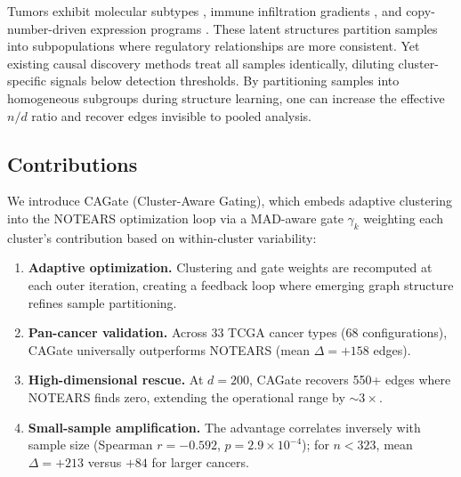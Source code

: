 \documentclass[12pt,a4paper]{article}
\begin{document}
Tumors exhibit molecular subtypes \cite{Perou2000}, immune infiltration gradients \cite{Thorsson2018}, and copy-number-driven expression programs \cite{Zack2013}. These latent structures partition samples into subpopulations where regulatory relationships are more consistent. Yet existing causal discovery methods treat all samples identically, diluting cluster-specific signals below detection thresholds. By partitioning samples into homogeneous subgroups during structure learning, one can increase the effective $n/d$ ratio and recover edges invisible to pooled analysis.









\subsection{Contributions}









We introduce CAGate (Cluster-Aware Gating), which embeds adaptive clustering into the NOTEARS optimization loop via a MAD-aware gate $\gamma_k$ weighting each cluster's contribution based on within-cluster variability:









\begin{enumerate}[leftmargin=*,itemsep=2pt]




    \item \textbf{Adaptive optimization.} Clustering and gate weights are recomputed at each outer iteration, creating a feedback loop where emerging graph structure refines sample partitioning.




    \item \textbf{Pan-cancer validation.} Across 33 TCGA cancer types (68 configurations), CAGate universally outperforms NOTEARS (mean $\Delta = +158$ edges).




    \item \textbf{High-dimensional rescue.} At $d=200$, CAGate recovers 550+ edges where NOTEARS finds zero, extending the operational range by $\sim 3\times$.




    \item \textbf{Small-sample amplification.} The advantage correlates inversely with sample size (Spearman $r = -0.592$, $p = 2.9\times 10^{-4}$); for $n < 323$, mean $\Delta = +213$ versus $+84$ for larger cancers.




\end{enumerate}
\end{document}
